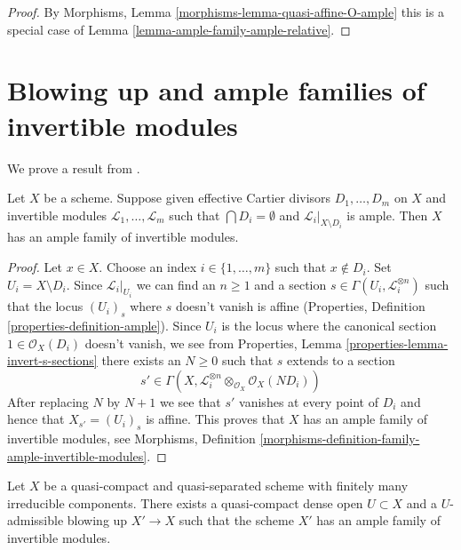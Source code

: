 \begin{proof}
By Morphisms, Lemma \ref{morphisms-lemma-quasi-affine-O-ample}
this is a special case of
Lemma \ref{lemma-ample-family-ample-relative}.
\end{proof}






\section{Blowing up and ample families of invertible modules}
\label{section-ample-family-by-blowing-up}

\noindent
We prove a result from \cite{Gross-thesis}.

\begin{lemma}
\label{lemma-get-ample-family}
Let $X$ be a scheme. Suppose given effective Cartier divisors
$D_1, \ldots, D_m$ on $X$ and invertible modules
$\mathcal{L}_1, \ldots, \mathcal{L}_m$ such that
$\bigcap D_i = \emptyset$ and $\mathcal{L}_i|_{X \setminus D_i}$
is ample. Then $X$ has an ample family of invertible modules.
\end{lemma}

\begin{proof}
Let $x \in X$. Choose an index $i \in \{1, \ldots, m\}$
such that $x \not \in D_i$. Set $U_i = X \setminus D_i$.
Since $\mathcal{L}_i|_{U_i}$ we can find an $n \geq 1$ and
a section $s \in \Gamma(U_i, \mathcal{L}_i^{\otimes n})$
such that the locus $(U_i)_s$ where $s$ doesn't vanish is affine
(Properties, Definition \ref{properties-definition-ample}).
Since $U_i$ is the locus where the canonical section
$1 \in \mathcal{O}_X(D_i)$ doesn't vanish, we see from
Properties, Lemma \ref{properties-lemma-invert-s-sections}
there exists an $N \geq 0$ such that $s$ extends to a section
$$
s' \in \Gamma(X, \mathcal{L}_i^{\otimes n} \otimes_{\mathcal{O}_X}
\mathcal{O}_X(N D_i))
$$
After replacing $N$ by $N + 1$ we see that $s'$ vanishes at every
point of $D_i$ and hence that $X_{s'} = (U_i)_s$ is affine.
This proves that $X$ has an ample family of invertible modules, see
Morphisms, Definition
\ref{morphisms-definition-family-ample-invertible-modules}.
\end{proof}

\begin{lemma}
\label{lemma-blow-up-ample-family}
\begin{reference}
\cite[Proposition 1.3.1]{Gross-thesis}
\end{reference}
Let $X$ be a quasi-compact and quasi-separated scheme with finitely
many irreducible components. There exists a quasi-compact dense open
$U \subset X$ and a $U$-admissible blowing up $X' \to X$ such that the
scheme $X'$ has an ample family of invertible modules.
\end{lemma}

